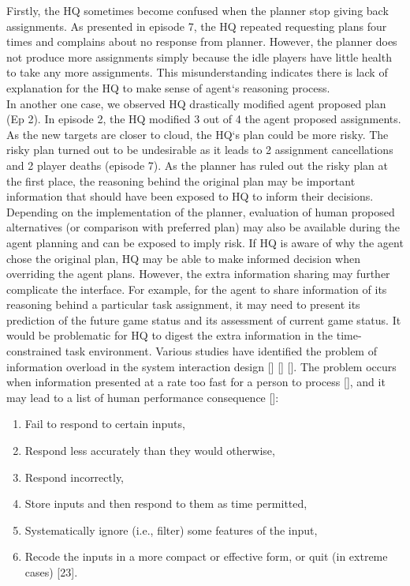 Firstly, the HQ sometimes become confused when the planner stop giving back assignments. As presented in episode 7, the HQ repeated requesting plans four times and complains about no response from planner. However, the planner does not produce more assignments simply because the idle players have little health to take any more assignments. This misunderstanding indicates there is lack of explanation for the HQ to make sense of agent`s reasoning process. \\

In another one case, we observed HQ drastically modified agent proposed plan (Ep 2). In episode 2, the HQ modified 3 out of 4 the agent proposed assignments. As the new targets are closer to cloud, the HQ`s plan could be more risky. The risky plan turned out to be undesirable as it leads to 2 assignment cancellations and 2 player deaths (episode 7). As the planner has ruled out the risky plan at the first place, the reasoning behind the original plan may be important information that should have been exposed to HQ to inform their decisions. Depending on the implementation of the planner, evaluation of human proposed alternatives (or comparison with preferred plan) may also be available during the agent planning and can be exposed to imply risk. If HQ is aware of why the agent chose the original plan, HQ may be able to make informed decision when overriding the agent plans. However, the extra information sharing may further complicate the interface. For example, for the agent to share information of its reasoning behind a particular task assignment, it may need to present its prediction of the future game status and its assessment of current game status. It would be problematic for HQ to digest the extra information in the time-constrained task environment. Various studies have identified the problem of information overload in the system interaction design [] [] []. The problem occurs when information presented at a rate too fast for a person to process [], and it may lead to a list of human performance consequence []:\\

\begin{enumerate}
\item Fail to respond to certain inputs,
\item Respond less accurately than they would otherwise,
\item Respond incorrectly,
\item Store inputs and then respond to them as time permitted,
\item Systematically ignore (i.e., filter) some features of the input,
\item Recode the inputs in a more compact or effective form, or quit (in extreme cases) [23].
\end{enumerate}

